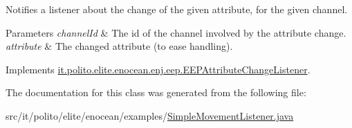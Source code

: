 Notifies a listener about the change of the given attribute, for the given channel. 
\begin{DoxyParams}{Parameters}
{\em channel\+Id} & The id of the channel involved by the attribute change. \\
\hline
{\em attribute} & The changed attribute (to ease handling). \\
\hline
\end{DoxyParams}


Implements \hyperlink{interfaceit_1_1polito_1_1elite_1_1enocean_1_1enj_1_1eep_1_1_e_e_p_attribute_change_listener_a8ed543f4de048252dfd133116d488382}{it.\+polito.\+elite.\+enocean.\+enj.\+eep.\+E\+E\+P\+Attribute\+Change\+Listener}.



The documentation for this class was generated from the following file\+:\begin{DoxyCompactItemize}
\item 
src/it/polito/elite/enocean/examples/\hyperlink{_simple_movement_listener_8java}{Simple\+Movement\+Listener.\+java}\end{DoxyCompactItemize}
